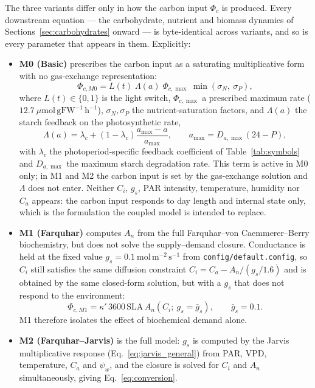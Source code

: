 \documentclass[a4paper,fleqn]{cas-sc}
\begin{document}
The three variants differ only in how the carbon input $\Phi_c$ is produced. Every
downstream equation --- the carbohydrate, nutrient and biomass dynamics of
Sections~\ref{sec:carbohydrates} onward --- is byte-identical across variants,
and so is every parameter that appears in them. Explicitly:

\begin{itemize}
\item \textbf{M0 (Basic)} prescribes the carbon input as a saturating
      multiplicative form with no gas-exchange representation:
      \begin{equation}
      \Phi_{c,M0} = L(t)\;\Lambda(a)\;\Phi_{c,\max}\;
                \min\!\left(\sigma_N,\ \sigma_P\right),
      \label{eq:m0}
      \end{equation}
      where $L(t)\in\{0,1\}$ is the light switch, $\Phi_{c,\max}$ a prescribed
      maximum rate ($12.7\ \mu\mathrm{mol\,gFW^{-1}\,h^{-1}}$),
      $\sigma_N,\sigma_P$ the nutrient-saturation factors, and $\Lambda(a)$
      the starch feedback on the photosynthetic rate,
      \begin{equation}
      \Lambda(a) = \lambda_c
        + \left(1-\lambda_c\right)\frac{a_{\max}-a}{a_{\max}},
      \qquad a_{\max} = D_{a,\max}\left(24 - P\right),
      \label{eq:starch_feedback}
      \end{equation}
      with $\lambda_c$ the photoperiod-specific feedback coefficient of
      Table~\ref{tab:symbols} and $D_{a,\max}$ the maximum starch
      degradation rate. This term is active in M0 only; in M1 and M2 the
      carbon input is set by the gas-exchange solution and $\Lambda$ does
      not enter. Neither $C_i$,
      $g_s$, PAR intensity, temperature, humidity nor $C_a$ appears: the
      carbon input responds to day length and internal state only, which is
      the formulation the coupled model is intended to replace.

\item \textbf{M1 (Farquhar)} computes $A_n$ from the full
      Farquhar--von Caemmerer--Berry biochemistry, but does not solve the
      supply--demand closure. Conductance is held at the fixed value
      $g_s = 0.1\ \mathrm{mol\,m^{-2}\,s^{-1}}$ from
      \texttt{config/default.config}, so $C_i$ still satisfies the same
      diffusion constraint
      $C_i = C_a - A_n/(g_s/1.6)$ and is obtained by the same closed-form
      solution, but with a $g_s$ that does not respond to the environment:
      \begin{equation}
      \Phi_{c,M1} = \kappa'\,3600\,\mathrm{SLA}\,
                A_n\!\left(C_i;\ g_s = \bar{g}_s\right),
      \qquad \bar{g}_s = 0.1 .
      \label{eq:m1}
      \end{equation}
      M1 therefore isolates the effect of biochemical demand alone.

\item \textbf{M2 (Farquhar--Jarvis)} is the full model:
      $g_s$ is computed by the Jarvis multiplicative response
      (Eq.~\eqref{eq:jarvis_general}) from PAR, VPD, temperature, $C_a$ and
      $\psi_w$, and the closure is solved for $C_i$ and $A_n$
      simultaneously, giving Eq.~\eqref{eq:conversion}.
\end{itemize}
\end{document}
